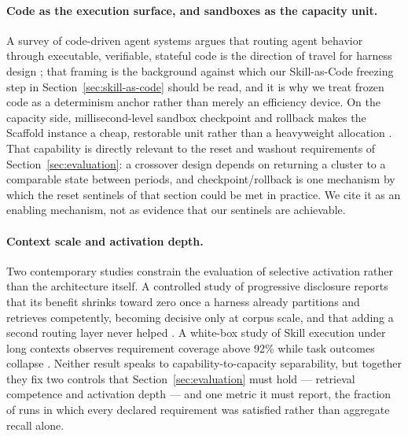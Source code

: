 \documentclass[11pt]{article}
\begin{document}
\paragraph{Code as the execution surface, and sandboxes as the capacity unit.}
A survey of code-driven agent systems argues that routing agent behavior through executable, verifiable, stateful code is the direction of travel for harness design \cite{ning2026codeharness}; that framing is the background against which our Skill-as-Code freezing step in Section~\ref{sec:skill-as-code} should be read, and it is why we treat frozen code as a determinism anchor rather than merely an efficiency device. On the capacity side, millisecond-level sandbox checkpoint and rollback makes the Scaffold instance a cheap, restorable unit rather than a heavyweight allocation \cite{dong2026deltabox}. That capability is directly relevant to the reset and washout requirements of Section~\ref{sec:evaluation}: a crossover design depends on returning a cluster to a comparable state between periods, and checkpoint/rollback is one mechanism by which the reset sentinels of that section could be met in practice. We cite it as an enabling mechanism, not as evidence that our sentinels are achievable.

\paragraph{Context scale and activation depth.}
Two contemporary studies constrain the evaluation of selective activation rather than the architecture itself. A controlled study of progressive disclosure reports that its benefit shrinks toward zero once a harness already partitions and retrieves competently, becoming decisive only at corpus scale, and that adding a second routing layer never helped \cite{he2026disclosure}. A white-box study of Skill execution under long contexts observes requirement coverage above 92\% while task outcomes collapse \cite{xue2026longcontext}. Neither result speaks to capability-to-capacity separability, but together they fix two controls that Section~\ref{sec:evaluation} must hold --- retrieval competence and activation depth --- and one metric it must report, the fraction of runs in which every declared requirement was satisfied rather than aggregate recall alone.
\end{document}
